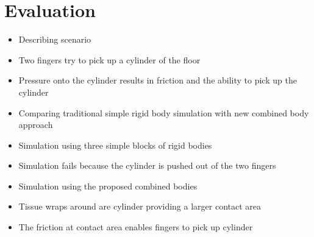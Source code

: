 \chapter{Evaluation}
\label{cha:evaluation}

\begin{itemize}
\item Describing scenario
\item Two fingers try to pick up a cylinder of the floor
\item Pressure onto the cylinder results in friction and the ability to pick up the cylinder
\item Comparing traditional simple rigid body simulation with new combined body approach
\item Simulation using three simple blocks of rigid bodies
\item Simulation fails because the cylinder is pushed out of the two fingers
\item Simulation using the proposed combined bodies
\item Tissue wraps around are cylinder providing a larger contact area
\item The friction at contact area enables fingers to pick up cylinder
\end{itemize}

%
